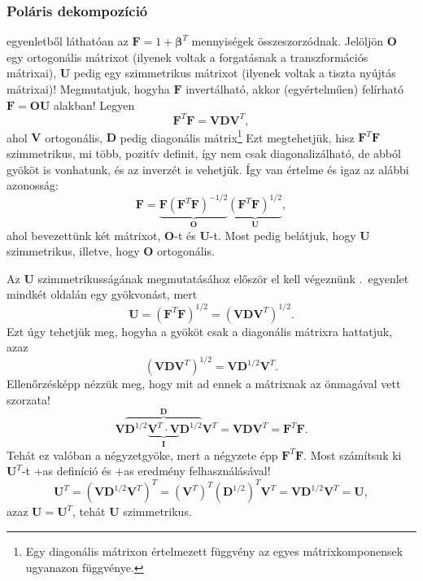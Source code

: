 \documentclass[12pt,a4paper]{scrartcl}
\let\mathbf\bm
\begin{document}
\subsubsection{Poláris dekompozíció} \label{sec:polaris_dekomp}
\Az{\eqref{eq:disztrozio_def}} egyenletből láthatóan az ${\mathbf{F}} = 1 + {{\mathbf{\beta }}^T}$ mennyiségek összeszorzódnak. Jelöljön ${\mathbf{O}}$ egy ortogonális mátrixot (ilyenek voltak a forgatásnak a transzformációs mátrixai), ${\mathbf{U}}$ pedig egy szimmetrikus mátrixot (ilyenek voltak a tiszta nyújtás mátrixai)! Megmutatjuk, hogyha ${\mathbf{F}}$ invertálható, akkor (egyértelműen) felírható ${\mathbf{F}} = {\mathbf{OU}}$ alakban!
Legyen
\begin{equation} \label{eq:szimm_def_grad}
{{\mathbf{F}}^T}{\mathbf{F}} = {\mathbf{VD}}{{\mathbf{V}}^T},
\end{equation}
ahol ${\mathbf{V}}$ ortogonális, ${{\mathbf{D}}}$ pedig diagonális mátrix\footnote{Egy diagonális mátrixon értelmezett függvény az egyes mátrixkomponensek ugyanazon függvénye.} Ezt megtehetjük, hisz ${{\mathbf{F}}^T}{\mathbf{F}}$ szimmetrikus, mi több, pozitív definit, így nem csak diagonalizálható, de abból gyököt is vonhatunk, és az inverzét is vehetjük. Így van értelme és igaz az alábbi azonosság:
\[{\mathbf{F}} = \underbrace {{\mathbf{F}}{{\left( {{{\mathbf{F}}^T}{\mathbf{F}}} \right)}^{ - 1/2}}}_{\mathbf{O}}\underbrace {{{\left( {{{\mathbf{F}}^T}{\mathbf{F}}} \right)}^{1/2}}}_{\mathbf{U}},\]
ahol bevezettünk két mátrixot, ${\mathbf{O}}$-t és ${\mathbf{U}}$-t. Most pedig belátjuk, hogy ${\mathbf{U}}$ szimmetrikus, illetve, hogy ${\mathbf{O}}$ ortogonális.

Az ${\mathbf{U}}$ szimmetrikusságának megmutatásához először el kell végeznünk \az{\eqref{eq:szimm_def_grad}}.\ egyenlet mindkét oldalán egy gyökvonást, mert
\begin{equation} \label{eq:Udef}
{\mathbf{U}} = {\left( {{{\mathbf{F}}^T}{\mathbf{F}}} \right)^{1/2}} = {\left( {{\mathbf{VD}}{{\mathbf{V}}^T}} \right)^{1/2}}.
\end{equation}
Ezt úgy tehetjük meg, hogyha a gyököt csak a diagonális mátrixra hattatjuk, azaz
\begin{equation} \label{eq:diag_m_fgv}
{\left( {{\mathbf{VD}}{{\mathbf{V}}^T}} \right)^{1/2}} = {\mathbf{V}}{{\mathbf{D}}^{1/2}}{{\mathbf{V}}^T}.
\end{equation}
Ellenőrzésképp nézzük meg, hogy mit ad ennek a mátrixnak az önmagával vett szorzata!
\[
  {\mathbf{V}}\overbrace {{{\mathbf{D}}^{1/2}}\underbrace {{{\mathbf{V}}^T} \cdot {\mathbf{V}}}_{\mathbf{I}}{{\mathbf{D}}^{1/2}}}^{\mathbf{D}}{{\mathbf{V}}^T} = {\mathbf{VD}}{{\mathbf{V}}^T} = {{\mathbf{F}}^T}{\mathbf{F}}.
\]
Tehát ez valóban a négyzetgyöke, mert a négyzete épp ${{{\mathbf{F}}^T}{\mathbf{F}}}$. Most számítsuk ki ${{\mathbf{U}}^T}$-t +as{} definíció és +as{} eredmény felhasználásával!
\[{{\mathbf{U}}^T} = {\left( {{\mathbf{V}}{{\mathbf{D}}^{1/2}}{{\mathbf{V}}^T}} \right)^T} = {\left( {{{\mathbf{V}}^T}} \right)^T}{\left( {{{\mathbf{D}}^{1/2}}} \right)^T}{{\mathbf{V}}^T} = {\mathbf{V}}{{\mathbf{D}}^{1/2}}{{\mathbf{V}}^T} = {{\mathbf{U}}},\]
azaz ${\mathbf{U}} = {{\mathbf{U}}^T}$, tehát ${\mathbf{U}}$ szimmetrikus.
\end{document}
